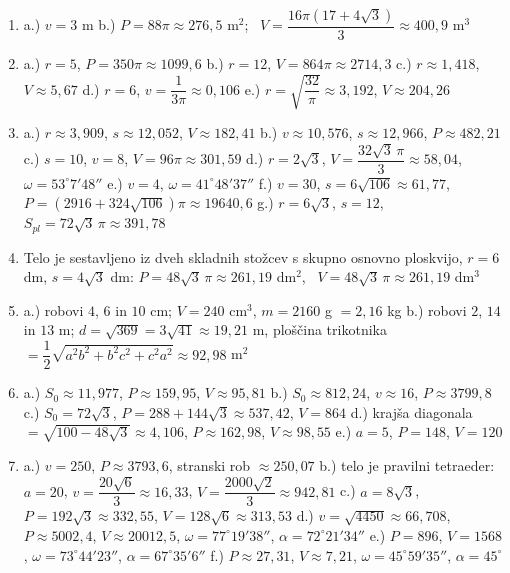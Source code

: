 \documentclass[a4paper,11pt]{letter}
\begin{document}
\small
\begin{enumerate}
\item a.) $v=3$ m \quad
      b.) $P=88\pi\approx 276{,}5$ m$^2$; \ $V=\dfrac{16\pi\left(17+4\sqrt{3}\right)}{3}\approx 400{,}9$ m$^3$

\item a.) $r=5$, $P=350\pi\approx 1099{,}6$ \quad
      b.) $r=12$, $V=864\pi\approx 2714{,}3$ \quad
      c.) $r\approx 1{,}418$, $V\approx 5{,}67$ \quad
      d.) $r=6$, $v=\dfrac{1}{3\pi}\approx 0{,}106$ \quad
      e.) $r=\sqrt{\dfrac{32}{\pi}}\approx 3{,}192$, $V\approx 204{,}26$

\item a.) $r\approx 3{,}909$, $s\approx 12{,}052$, $V\approx 182{,}41$ \quad
      b.) $v\approx 10{,}576$, $s\approx 12{,}966$, $P\approx 482{,}21$ \quad
      c.) $s=10$, $v=8$, $V=96\pi\approx 301{,}59$ \quad
      d.) $r=2\sqrt{3}$, $V=\dfrac{32\sqrt{3}\,\pi}{3}\approx 58{,}04$, $\omega=53^{\circ}7'48''$ \quad
      e.) $v=4$, $\omega=41^{\circ}48'37''$ \quad
      f.) $v=30$, $s=6\sqrt{106}\approx 61{,}77$, $P=\left(2916+324\sqrt{106}\right)\pi\approx 19640{,}6$ \quad
      g.) $r=6\sqrt{3}$, $s=12$, $S_{pl}=72\sqrt{3}\,\pi\approx 391{,}78$

\item Telo je sestavljeno iz dveh skladnih stožcev s skupno osnovno ploskvijo,
      $r=6$ dm, $s=4\sqrt{3}$ dm:
      $P=48\sqrt{3}\,\pi\approx 261{,}19$ dm$^2$, \ $V=48\sqrt{3}\,\pi\approx 261{,}19$ dm$^3$

\item a.) robovi $4$, $6$ in $10$ cm; $V=240$ cm$^3$, $m=2160$ g $=2{,}16$ kg \quad
      b.) robovi $2$, $14$ in $13$ m; $d=\sqrt{369}=3\sqrt{41}\approx 19{,}21$ m,
      ploščina trikotnika $=\dfrac{1}{2}\sqrt{a^2b^2+b^2c^2+c^2a^2}\approx 92{,}98$ m$^2$

\item a.) $S_0\approx 11{,}977$, $P\approx 159{,}95$, $V\approx 95{,}81$ \quad
      b.) $S_0\approx 812{,}24$, $v\approx 16$, $P\approx 3799{,}8$ \quad
      c.) $S_0=72\sqrt{3}$, $P=288+144\sqrt{3}\approx 537{,}42$, $V=864$ \quad
      d.) krajša diagonala $=\sqrt{100-48\sqrt{3}}\approx 4{,}106$, $P\approx 162{,}98$, $V\approx 98{,}55$ \quad
      e.) $a=5$, $P=148$, $V=120$

\item a.) $v=250$, $P\approx 3793{,}6$, stranski rob $\approx 250{,}07$ \quad
      b.) telo je pravilni tetraeder: $a=20$, $v=\dfrac{20\sqrt{6}}{3}\approx 16{,}33$,
      $V=\dfrac{2000\sqrt{2}}{3}\approx 942{,}81$ \quad
      c.) $a=8\sqrt{3}$, $P=192\sqrt{3}\approx 332{,}55$, $V=128\sqrt{6}\approx 313{,}53$ \quad
      d.) $v=\sqrt{4450}\approx 66{,}708$, $P\approx 5002{,}4$, $V\approx 20012{,}5$,
      $\omega=77^{\circ}19'38''$, $\alpha=72^{\circ}21'34''$ \quad
      e.) $P=896$, $V=1568$, $\omega=73^{\circ}44'23''$, $\alpha=67^{\circ}35'6''$ \quad
      f.) $P\approx 27{,}31$, $V\approx 7{,}21$, $\omega=45^{\circ}59'35''$, $\alpha=45^{\circ}$


\end{enumerate}
\end{document}
